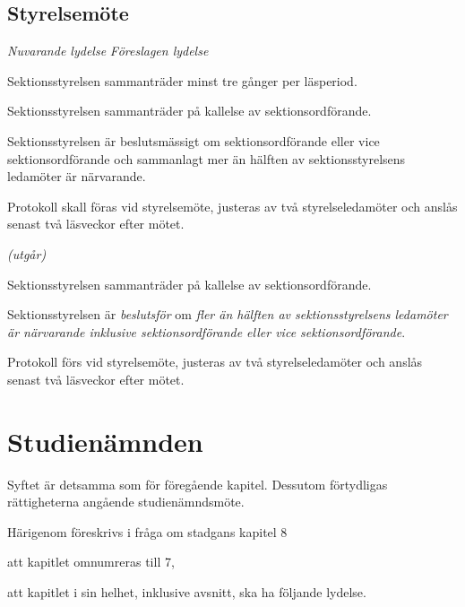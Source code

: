 \documentclass{article}
\newenvironment{lydelse}
    {\begin{paracol}{2}%
        \emph{Nuvarande lydelse}%
        \switchcolumn%
        \emph{Föreslagen lydelse}%
    \end{paracol}%
    \begin{enumerate}[label=\thesubsection.\arabic*]%
    \begin{paracol}{2}%
    }{\end{paracol}\end{enumerate}}
\begin{document}

\subsection{Styrelsemöte}
\begin{lydelse}
  \setcounter{section}{7}
  \setcounter{subsection}{5}
  \item Sektionsstyrelsen sammanträder minst tre gånger per läsperiod.
  \item Sektionsstyrelsen sammanträder på kallelse av sektionsordförande.
  \setcounter{subsection}{6}
  \setcounter{enumi}{0}
  \item Sektionsstyrelsen är beslutsmässigt om sektionsordförande eller vice sektionsordförande och sammanlagt mer än hälften av sektionsstyrelsens ledamöter är närvarande.
  \setcounter{subsection}{8}
  \setcounter{enumi}{0}
  \item Protokoll skall föras vid styrelsemöte, justeras av två
    styrelseledamöter och anslås senast två läsveckor efter mötet.
  \switchcolumn  

  \item[] \emph{(utgår)}
  \item Sektionsstyrelsen sammanträder på kallelse av sektionsordförande. \label{S:Styretkallelse}
  \item Sektionsstyrelsen är \emph{beslutsför} om \emph{fler än hälften av sektionsstyrelsens ledamöter är närvarande inklusive sektionsordförande eller vice sektionsordförande}.
  \item Protokoll förs vid styrelsemöte, justeras av två styrelseledamöter och anslås senast två läsveckor efter mötet.
\end{lydelse}
\setcounter{section}{6}
\setcounter{subsection}{2}

\section{Studienämnden}
Syftet är detsamma som för föregående kapitel.
Dessutom förtydligas rättigheterna angående studienämndsmöte.

Härigenom föreskrivs i fråga om stadgans kapitel 8
\begin{dels}
\item att kapitlet omnumreras till 7,
\item att kapitlet i sin helhet, inklusive avsnitt, ska ha följande lydelse.
\end{dels}
\end{document}

